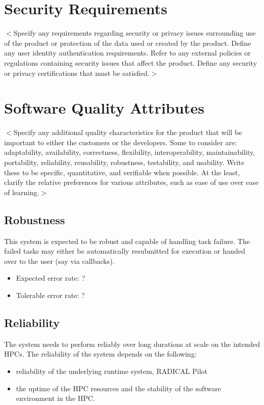 \documentclass{scrreprt}
\begin{document}
\section{Security Requirements}
$<$Specify any requirements regarding security or privacy issues surrounding use 
of the product or protection of the data used or created by the product. Define 
any user identity authentication requirements. Refer to any external policies or 
regulations containing security issues that affect the product. Define any 
security or privacy certifications that must be satisfied.$>$

\section{Software Quality Attributes}
$<$Specify any additional quality characteristics for the product that will be 
important to either the customers or the developers. Some to consider are: 
adaptability, availability, correctness, flexibility, interoperability, 
maintainability, portability, reliability, reusability, robustness, testability, 
and usability. Write these to be specific, quantitative, and verifiable when 
possible. At the least, clarify the relative preferences for various attributes, 
such as ease of use over ease of learning.$>$

\subsection{Robustness}

This system is expected to be robust and capable of handling task failure. The failed tasks may either be automatically resubmitted for execution or handed over to the user (say via callbacks). 

\begin{itemize}[noitemsep]
\item Expected error rate: ?
\item Tolerable error rate: ?
\end{itemize}

\subsection{Reliability}

The system needs to perform reliably over long durations at scale on the intended HPCs. 
The reliability of the system depends on the following:

\begin{itemize}[noitemsep]
\item reliability of the underlying runtime system, RADICAL Pilot
\item the uptime of the HPC resources and the stability of the software environment in the HPC.
\end{itemize}
\end{document}
